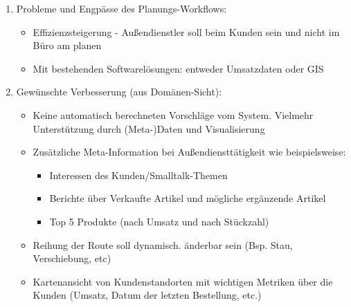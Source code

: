 \documentclass[Bachelorarbeit.tex]{subfiles}
\begin{document}
\begin{enumerate}
\begin{enumerate}
\begin{itemize}
		\end{itemize}
	\end{enumerate}
	\item Probleme und Engpässe des Planungs-Workflows:
	\begin{itemize}
		\item Effizienzsteigerung - Außendienstler soll beim Kunden sein und nicht im Büro am planen
		\item Mit bestehenden Softwarelösungen: entweder Umsatzdaten oder \ac{GIS} 
	\end{itemize}
	\item Gewünschte Verbesserung (aus Domänen-Sicht):
	\begin{itemize}
		\item Keine automatisch berechneten Vorschläge vom System. Vielmehr Unterstützung durch (Meta-)Daten und Visualisierung
		\item Zusätzliche Meta-Information bei Außendiensttätigkeit wie beispielsweise:
		\begin{itemize}
			\item Interessen des Kunden/Smalltalk-Themen
			\item Berichte über Verkaufte Artikel und mögliche ergänzende Artikel
			\item Top 5 Produkte (nach Umsatz und nach Stückzahl)
		\end{itemize}
		\item Reihung der Route soll dynamisch. änderbar sein (Bsp. Stau, Verschiebung, etc)
		\item Kartenansicht von Kundenstandorten mit wichtigen Metriken über die Kunden (Umsatz, Datum der letzten Bestellung, etc.)
	\end{itemize}
\end{enumerate}
\newpage
\end{document}

